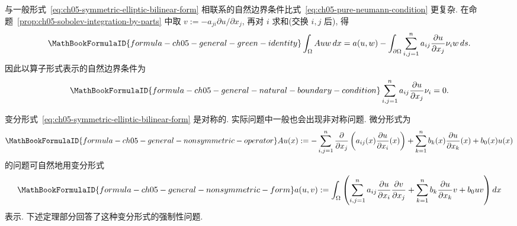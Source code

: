 与一般形式~\eqref{eq:ch05-symmetric-elliptic-bilinear-form} 相联系的自然边界条件比式~\eqref{eq:ch05-pure-neumann-condition} 更复杂. 在命题~\ref{prop:ch05-sobolev-integration-by-parts} 中取 $v:=-a_{ji}\partial u/\partial x_j$, 再对 $i$ 求和(交换 $i,j$ 后), 得
\[
\MathBookFormulaID{formula-ch05-general-green-identity}
\int_\Omega Auw\,dx
=a(u,w)-\int_{\partial\Omega}\sum_{i,j=1}^n
a_{ij}\frac{\partial u}{\partial x_j}\nu_iw\,ds.
\]
因此以算子形式表示的自然边界条件为
\begin{equation}
\MathBookFormulaID{formula-ch05-general-natural-boundary-condition}
\label{eq:ch05-general-natural-boundary-condition}
\sum_{i,j=1}^na_{ij}\frac{\partial u}{\partial x_j}\nu_i=0.
\end{equation}

变分形式~\eqref{eq:ch05-symmetric-elliptic-bilinear-form} 是对称的. 实际问题中一般也会出现非对称问题. 微分形式为
\begin{equation}
\MathBookFormulaID{formula-ch05-general-nonsymmetric-operator}
\label{eq:ch05-general-nonsymmetric-operator}
Au(x):=-\sum_{i,j=1}^n\frac{\partial}{\partial x_j}
\left(a_{ij}(x)\frac{\partial u}{\partial x_i}(x)\right)
+\sum_{k=1}^nb_k(x)\frac{\partial u}{\partial x_k}(x)+b_0(x)u(x)
\end{equation}
的问题可自然地用变分形式
\begin{equation}
\MathBookFormulaID{formula-ch05-general-nonsymmetric-form}
\label{eq:ch05-general-nonsymmetric-form}
a(u,v):=\int_\Omega\left(
\sum_{i,j=1}^na_{ij}\frac{\partial u}{\partial x_i}\frac{\partial v}{\partial x_j}
+\sum_{k=1}^nb_k\frac{\partial u}{\partial x_k}v+b_0uv
\right)dx
\end{equation}
表示. 下述定理部分回答了这种变分形式的强制性问题.

